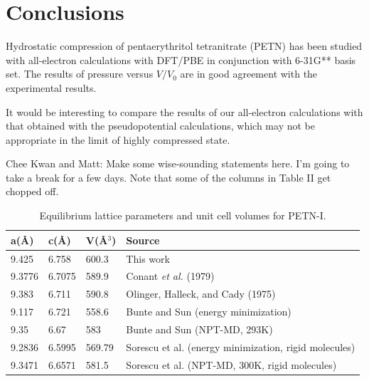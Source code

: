 \documentclass[prb,aps,nobibnotes,twocolumn,doublespace,twocolumngrid,superbib]{revtex4}
\begin{document}
\section{Conclusions}
\label{sec:conclusions}
Hydrostatic compression of pentaerythritol tetranitrate (PETN) has
been studied with all-electron calculations with DFT/PBE in
conjunction with 6-31G** basis set. The results of pressure versus 
$V/V_0$ are in good agreement with the experimental results.

It would be interesting to compare the results of 
our all-electron calculations with that
obtained with the pseudopotential
calculations, which may not be appropriate in 
the limit of highly compressed state.

Chee Kwan and Matt: Make some wise-sounding statements here.
I'm going to take a break for a few days.  Note that some of
the columns in Table II get chopped off.


\begin{table}[p]
\begin{center}
\begin{tabular}{llll}
\hline\hline
a(\AA) & c(\AA) & V(\AA$^3$) & Source \\
\hline
9.425  & 6.758  &  600.3  & This work \\
9.3776 & 6.7075 &  589.9  & Conant {\it et al.} (1979) \\
9.383  & 6.711  &  590.8  & Olinger, Halleck, and Cady (1975) \\
9.117  & 6.721  &  558.6  & Bunte and Sun (energy minimization) \\
9.35   & 6.67   &  583    & Bunte and Sun (NPT-MD, 293K) \\
9.2836 & 6.5995 &  569.79 & Sorescu et al. (energy minimization, rigid molecules) \\
9.3471 & 6.6571 &  581.5  & Sorescu et al. (NPT-MD, 300K, rigid molecules) \\
\hline\hline
\end{tabular}
\end{center}
\caption{Equilibrium lattice parameters and unit cell volumes for PETN-I.
}
\label{tab:table1}
\end{table}
\end{document}
